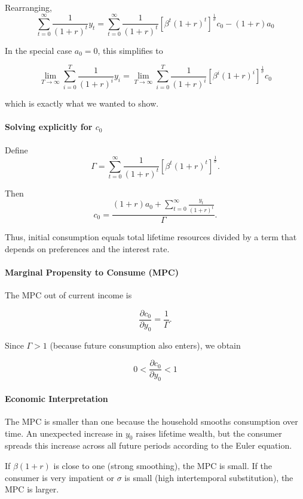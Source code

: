 \documentclass[12pt]{article}
\begin{document}
Rearranging,
\[
\boxed{
\sum_{t=0}^{\infty} \frac{1}{(1+r)^t} y_t
=
\sum_{t=0}^{\infty} 
\frac{1}{(1+r)^t}
[\beta^t (1+r)^t]^{\frac{1}{\sigma}} c_0
- (1+r)a_0
}
\]

In the special case $a_0 = 0$, this simplifies to

\[
\boxed{
\lim_{T \rightarrow \infty} 
\sum_{i=0}^T \frac{1}{(1+r)^i} y_i
=
\lim_{T \rightarrow \infty} 
\sum_{i=0}^T 
\frac{1}{(1+r)^i}
\left[\beta^i (1+r)^i \right]^{\frac{1}{\sigma}} c_0
}
\]

which is exactly what we wanted to show.

\paragraph{Solving explicitly for $c_0$}

Define
\[
\Gamma
=
\sum_{t=0}^{\infty}
\frac{1}{(1+r)^t}
[\beta^t (1+r)^t]^{\frac{1}{\sigma}}.
\]

Then
\[
c_0
=
\frac{
(1+r)a_0
+
\sum_{t=0}^{\infty} \frac{y_t}{(1+r)^t}
}{
\Gamma
}.
\]

Thus, initial consumption equals total lifetime resources divided by a term that depends on preferences and the interest rate.

\paragraph{Marginal Propensity to Consume (MPC)}

The MPC out of current income is

\[
\frac{\partial c_0}{\partial y_0}
=
\frac{1}{\Gamma}.
\]

Since $\Gamma > 1$ (because future consumption also enters), we obtain

\[
\boxed{
0 < \frac{\partial c_0}{\partial y_0} < 1
}
\]

\paragraph{Economic Interpretation}

The MPC is smaller than one because the household smooths consumption over time. An unexpected increase in $y_0$ raises lifetime wealth, but the consumer spreads this increase across all future periods according to the Euler equation. 

If $\beta(1+r)$ is close to one (strong smoothing), the MPC is small.  
If the consumer is very impatient or $\sigma$ is small (high intertemporal substitution), the MPC is larger.
\end{document}

